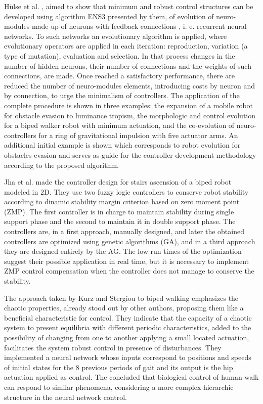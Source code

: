 Hülse et al. \cite{Huelse04Structure}, aimed to show that minimum and robust control structures can be developed using algorithm ENS3 presented by them, of evolution of neuro-modules made up of neurons with feedback connections , i. e. recurrent neural networks. To such networks an evolutionary algorithm is applied, where evolutionary operators are applied in each iteration: reproduction, variation (a type of mutation), evaluation and selection. In that process changes in the number of hidden neurons, their number of connections and the weights of such connections, are made. Once reached a satisfactory performance, there are reduced the number of  neuro-modules elements, introducing costs by neuron and by connection, to urge the minimalism of  controllers. The application of the complete procedure is shown in three examples: the expansion of a mobile robot for obstacle evasion to luminance tropism, the morphologic and control evolution for a biped walker robot with minimum actuation, and the co-evolution of neuro-controllers for a ring of gravitational impulsion with five actuator arms. An additional initial example is shown which corresponds to robot evolution for obstacles evasion and serves as guide for the controller development methodology according to the proposed algorithm.


Jha et al. \cite{Jha05On-line} made the controller design for stairs ascension of a biped robot modeled in 2D. They use two fuzzy logic controllers to conserve robot stability according to dinamic stability margin criterion based on zero moment point (ZMP). The first controller is in charge to maintain stability during single support phase and the second to maintain it in double support phase. The controllers are, in a first approach, manually designed, and later the obtained controllers are optimized using genetic algorithms (GA), and in a third approach they are designed entirely by the AG. The low run times of the optimization suggest their possible application in real time, but it is necessary to implement ZMP control compensation when the controller does not manage to conserve the stability.


The approach taken by Kurz and Stergiou \cite{Kurz05artificial} to biped walking emphasizes the chaotic properties, already stood out by other authors, proposing them like a beneficial characteristic for control. They indicate that the capacity of a chaotic system to present equilibria with different periodic characteristics, added to the possibility of changing from one to another applying a small located actuation, facilitates the system robust control in presence of disturbances. They implemented a neural network whose inputs correspond to positions and speeds of initial states for the 8 previous periods of gait and its output is the hip actuation applied as control. The concluded that biological control of human walk can respond to similar phenomena, considering a more complex hierarchic structure in the neural network control.


